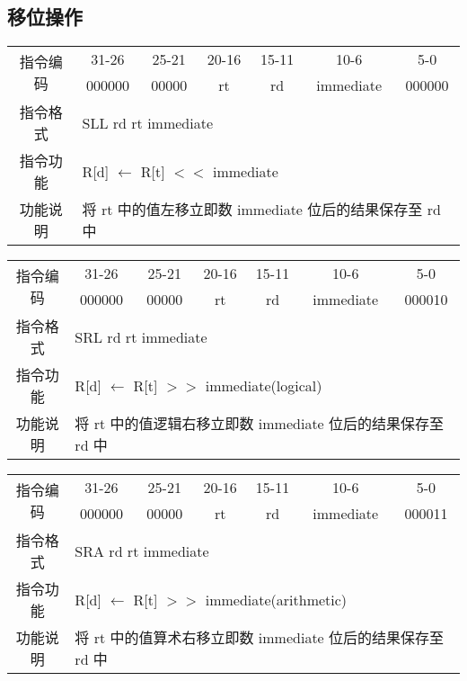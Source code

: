 \subsection{移位操作}
	\begin{table}[!hbp]
		\centering
		\begin{tabular}{|c|c|c|c|c|c|c|}
		\hline
		\multirow{2}{*}{指令编码} & 31-26&25-21 & 20-16&15-11 &10-6 &5-0\\
		\cline{2-7} & 000000 & 00000 & rt & rd & immediate& 000000 \\
		\hline
		指令格式&\multicolumn{6}{|l|}{SLL rd rt immediate}\\
		\hline		
		指令功能&\multicolumn{6}{|l|}{R[d] $\leftarrow$  R[t] $<<$ immediate}\\
		\hline		
		功能说明&\multicolumn{6}{|l|}{将 rt 中的值左移立即数 immediate 位后的结果保存至 rd 中}\\
		\hline
		\end{tabular}
	\end{table}
	\begin{table}[!hbp]
		\centering
		\begin{tabular}{|c|c|c|c|c|c|c|}
		\hline
		\multirow{2}{*}{指令编码} & 31-26&25-21 & 20-16&15-11 &10-6 &5-0\\
		\cline{2-7} & 000000 & 00000 & rt & rd & immediate& 000010 \\
		\hline
		指令格式&\multicolumn{6}{|l|}{SRL rd rt immediate}\\
		\hline		
		指令功能&\multicolumn{6}{|l|}{R[d] $\leftarrow$  R[t] $>>$ immediate(logical)}\\
		\hline		
		功能说明&\multicolumn{6}{|l|}{将 rt 中的值逻辑右移立即数 immediate 位后的结果保存至 rd 中}\\
		\hline
		\end{tabular}
	\end{table}
	\begin{table}[!hbp]
		\centering
		\begin{tabular}{|c|c|c|c|c|c|c|}
		\hline
		\multirow{2}{*}{指令编码} & 31-26&25-21 & 20-16&15-11 &10-6 &5-0\\
		\cline{2-7} & 000000 & 00000 & rt & rd & immediate& 000011 \\
		\hline
		指令格式&\multicolumn{6}{|l|}{SRA rd rt immediate}\\
		\hline		
		指令功能&\multicolumn{6}{|l|}{R[d] $\leftarrow$  R[t] $>>$ immediate(arithmetic)}\\
		\hline		
		功能说明&\multicolumn{6}{|l|}{将 rt 中的值算术右移立即数 immediate 位后的结果保存至 rd 中}\\
		\hline
		\end{tabular}
	\end{table}
\newpage

